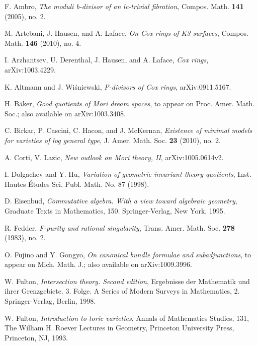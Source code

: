 \documentclass[12pt,twoside]{amsart}
\theoremstyle{definition}
\begin{document}
\begin{thebibliography}{HK}

 F. Ambro, \textit{The moduli b-divisor of an lc-trivial fibration},
Compos. Math. \textbf{141} (2005), no. 2.

 M. Artebani, J. Hausen, and A. Laface, \textit{On Cox rings of K3 surfaces},
Compos. Math. \textbf{146} (2010), no. 4.

 I. Arzhantsev, U. Derenthal, J. Hausen, and A. Laface,
\textit{Cox rings}, arXiv:1003.4229.

 K. Altmann and J. Wi\'{s}niewski, \textit{P-divisors of Cox rings},
arXiv:0911.5167.


 H. B\"{a}ker, \textit{Good quotients of Mori dream spaces},
to appear on Proc. Amer. Math. Soc.; also available on arXiv:1003.3408.


 C. Birkar, P. Cascini, C. Hacon, and J. McKernan,
\textit{Existence of minimal models for varieties of log general type},
J. Amer. Math. Soc. \textbf{23} (2010), no. 2.

 A. Corti, V. Lazic, \textit{New outlook on Mori theory, II},
arXiv:1005.0614v2.

 I. Dolgachev and Y. Hu, \textit{Variation of geometric invariant theory quotients},
Inst. Hautes \'{E}tudes Sci. Publ. Math. No. 87 (1998).

 D. Eisenbud, \textit{Commutative algebra. With a view toward algebraic geometry},
Graduate Texts in Mathematics, 150. Springer-Verlag, New York, 1995.

 R. Fedder, \textit{F-purity and rational singularity},
 Trans. Amer. Math. Soc. \textbf{278} (1983), no. 2.

 O. Fujino and Y. Gongyo, \textit{On canonical bundle formulae and subadjunctions},
to appear on Mich. Math. J.; also available on arXiv:1009.3996.

 W. Fulton, \textit{Intersection theory. Second edition},
Ergebnisse der Mathematik und ihrer Grenzgebiete. 3. Folge. A Series of Modern Surveys in Mathematics,
2. Springer-Verlag, Berlin, 1998.

 W. Fulton, \textit{Introduction to toric varieties},
Annals of Mathematics Studies, 131,
The William H. Roever Lectures in Geometry, Princeton University Press, Princeton, NJ, 1993.
 

\end{thebibliography}
\end{document}
